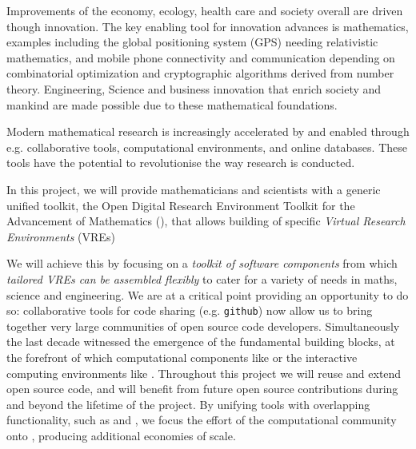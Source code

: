 Improvements of the economy, ecology, health care and society overall
are driven though innovation. The key enabling tool for innovation
advances is mathematics, examples including the global positioning
system (GPS) needing relativistic mathematics, and mobile phone
connectivity and communication depending on combinatorial optimization
and cryptographic algorithms derived from number theory. Engineering,
Science and business innovation that enrich society and mankind are
made possible due to these mathematical foundations.

Modern mathematical research is increasingly accelerated by and
enabled through e.g. collaborative tools, computational environments,
and online databases.
These tools have the potential to
revolutionise the way research is conducted. 

In this project, we will provide mathematicians and scientists with a
generic unified toolkit, the Open Digital Research Environment Toolkit
for the Advancement of Mathematics (\TheProject), that allows
building of specific \emph{Virtual Research Environments} (VREs)


We will achieve this by focusing on a \emph{toolkit of software
  components} from which \emph{tailored VREs can be assembled
  flexibly} to cater for a variety of needs in maths, science and
engineering.  We are at a critical point providing an opportunity to
do so: collaborative tools for code sharing (e.g.
\texttt{github}) now allow us to bring together very large communities of
open source code developers.%
Simultaneously the last decade witnessed the emergence of the
fundamental building blocks, at the forefront of which
computational components like \Sage or the interactive computing
environments like \Jupyter.
%
Throughout this project
we will reuse and extend open source code, and \TheProject will benefit
from future open source contributions during and beyond the lifetime
of the project. By unifying tools with overlapping functionality, such as \Jupyter and \Sage, we
focus the effort of the computational community onto \TheProject, producing additional economies of scale. 

